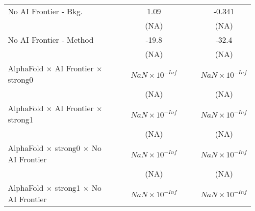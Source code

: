 \begin{tabular}{lcccccc}
   No AI Frontier - Bkg.                                                      &                        &                        & 1.09                   &                        &          & -0.341\\   
                                                                              &                        &                        & (NA)                   &                        &          & (NA)\\   
   No AI Frontier - Method                                                    &                        &                        & -19.8                  &                        &          & -32.4\\   
                                                                              &                        &                        & (NA)                   &                        &          & (NA)\\   
   AlphaFold $\times$ AI Frontier $\times$ strong0                            &                        &                        & $NaN\times 10^{-Inf}$  &                        &          & $NaN\times 10^{-Inf}$\\    
                                                                              &                        &                        & (NA)                   &                        &          & (NA)\\   
   AlphaFold $\times$ AI Frontier $\times$ strong1                            &                        &                        & $NaN\times 10^{-Inf}$  &                        &          & $NaN\times 10^{-Inf}$\\    
                                                                              &                        &                        & (NA)                   &                        &          & (NA)\\   
   AlphaFold $\times$ strong0 $\times$ No AI Frontier                         &                        &                        & $NaN\times 10^{-Inf}$  &                        &          & $NaN\times 10^{-Inf}$\\    
                                                                              &                        &                        & (NA)                   &                        &          & (NA)\\   
   AlphaFold $\times$ strong1 $\times$ No AI Frontier                         &                        &                        & $NaN\times 10^{-Inf}$  &                        &          & $NaN\times 10^{-Inf}$\\    

\end{tabular}
